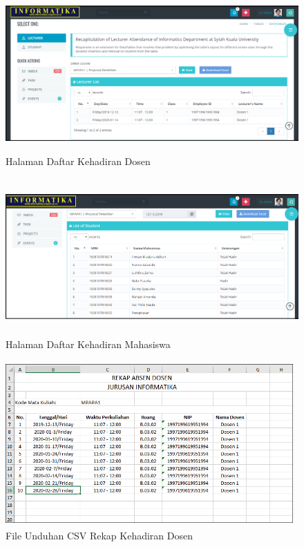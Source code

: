 \begin{enumerate}[a.]
		\vspace{-0.2cm}
		\begin{figure}[H]
		\center
		\includegraphics [width = 13cm, height= 6cm]{gambar/web/dashboard-dosen}
		\caption{Halaman Daftar Kehadiran Dosen}
		\label{web-daftar-dosen}
		\end{figure}
		
		\vspace{-0.2cm}
		\begin{figure}[H]
		\center
		\includegraphics [width = 13cm, height= 6cm]{gambar/web/dashboard-mahasiswa}
		\caption{Halaman Daftar Kehadiran Mahasiswa}
		\label{web-daftar-mahasiswa}
		\end{figure}
		
		\vspace{-0.2cm}
		\begin{figure}[H]
		\center
		\includegraphics [width = 11cm, height= 6.3cm]{gambar/web/rekap-dosen}
		\caption{File Unduhan CSV Rekap Kehadiran Dosen}
		\label{web-csv-dosen}
		\end{figure}
		

\end{enumerate}
